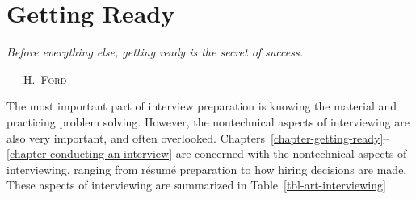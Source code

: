 \documentclass[10pt,openany,twoside,letterpaper,extrafontsizes]{memoir}
\newcommand{\epioffset}{0mm}
\newcommand\myepigraph[3]{%
\vspace{#3}%
\epigraph{\textit{#1}}{#2}%
}
\begin{document}
\chapter{Getting Ready}
\myepigraph{%
Before everything else, getting ready is the secret of success.%
}
{%
---~\textsc{H.~Ford}%
}{\epioffset}
\label{chapter-getting-ready}

\begin{Spacing}{\gettingReadySpacing}

\noindent
The most important part of interview preparation is knowing the
material and practicing problem solving. However, the nontechnical
aspects of interviewing are also very important, and often overlooked.
Chapters~\ref{chapter-getting-ready}--\ref{chapter-conducting-an-interview} are concerned
with the nontechnical aspects of interviewing, ranging from r\'{e}sum\'{e} preparation
to how hiring decisions are made.
These aspects of interviewing are summarized in Table~\vref{tbl-art-interviewing}


\end{Spacing}
\end{document}
